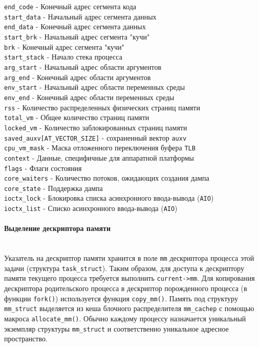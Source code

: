\documentclass[12pt]{article}
\begin{document}
\verb!end_code! - Конечный адрес сегмента кода\\
\verb!start_data! - Начальный адрес сегмента данных\\
\verb!end_data! - Конечный адрес сегмента данных\\
\verb!start_brk! - Начальный адрес сегмента "кучи"\\
\verb!brk! - Конечный адрес сегмента "кучи"\\
\verb!start_stack! - Начало стека процесса\\
\verb!arg_start! - Начальный адрес области аргументов\\
\verb!arg_end! - Конечный адрес области аргументов\\
\verb!env_start! - Начальный адрес области переменных среды\\
\verb!env_end! - Конечный адрес области переменных среды\\
\verb!rss! - Количество распределенных физических страниц памяти\\
\verb!total_vm! - Общее количество страниц памяти\\
\verb!locked_vm! - Количество заблокированных страниц памяти\\
\verb!saved_auxv[AT_VECTOR_SIZE]! - сохраненный вектор \verb!auxv!\\
\verb!cpu_vm_mask! - Маска отложенного переключения буфера \verb!TLB!\\
\verb!context! - Данные, специфичные для аппаратной платформы\\
\verb!flags! - Флаги состояния\\
\verb!core_waiters! - Количество потоков, ожидающих создания дампа\\
\verb!core_state! - Поддержка дампа\\
\verb!ioctx_lock! - Блокировка списка асинхронного ввода-вывода (\verb!AIO!)\\
\verb!ioctx_list! - Списко асинхронного ввода-вывода (\verb!AIO!)\\

\paragraph*{Выделение дескриптора памяти}
~\\

Указатель на дескриптор памяти хранится в поле \verb!mm! дескриптора процесса этой задачи (структура \verb!task_struct!).
Таким образом, для доступа к дескриптору памяти текущего процесса требуется выполнить \verb!current->mm!.
Для копирования дескриптора родительского процесса в дескриптор порожденного процесса (в функции \verb!fork()!)
используется функция \verb!copy_mm()!. Память под структуру \verb!mm_struct! выделяется из кеша блочного распределителя \verb!mm_cachep! с помощью макроса \verb!allocate_mm()!.
Обычно каждому процессу назначается уникальный экземпляр структуры \verb!mm_struct! и соответственно уникальное адресное пространство.
\end{document}
